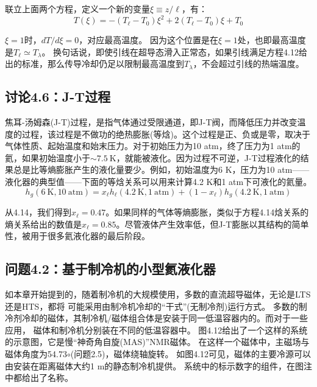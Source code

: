 联立上面两个方程，定义一个新的变量$\xi\equiv z/\ell$，有：
\begin{equation}%
T(\xi)=-(T_\ell-T_0)\xi^2+2(T_\ell-T_0)\xi+T_0
\end{equation}

$\xi=1$时，$dT/d\xi=0$，对应最高温度。
因为这个位置是在$\xi=1$处，也即最高温度是$T_\ell\simeq T_\lambda$。
换句话说，即使引线在超导态滑入正常态，如果引线满足方程4.12给出的标准，那么传导冷却仍足以限制最高温度到$T_\lambda$，不会超过引线的热端温度。


\subsection{讨论4.6：J-T过程}
焦耳-汤姆森(J-T)过程，是指气体通过受限通道，即J-T阀，而降低压力并改变温度的过程，该过程是不做功的绝热膨胀(等焓)。这个过程是正、负或是零，取决于气体性质、起始温度和始末压力。对于初始压力为10 atm，终了压力为1 atm的氦，如果初始温度小于$\sim 7.5\ \mathrm{K}$，就能被液化。因为过程不可逆，J-T过程液化的结果总是比等熵膨胀产生的液化量要少。例如，初始温度为6 K，压力为10 atm——液化器的典型值——下面的等焓关系可以用来计算4.2 K和1 atm下可液化的氦量。
\begin{equation}%
h_g(6\ \mathrm{K},10\ \mathrm{atm})=x_\ell h_\ell(4.2\ \mathrm{K},1\ \mathrm{atm})+(1-x_\ell)h_g(4.2\ \mathrm{K},1\ \mathrm{atm})
\end{equation}

从4.14，我们得到$x_\ell=0.47$。如果同样的气体等熵膨胀，类似于方程4.14焓关系的熵关系给出的数值是$x_\ell=0.85$。尽管液体产生效率低，但J-T膨胀以其结构的简单性，被用于很多氦液化器的最后阶段。


\subsection{问题4.2：基于制冷机的小型氦液化器}
如本章开始提到的，随着制冷机的大规模使用，多数的直流超导磁体，无论是LTS还是HTS，都将
可能采用由制冷机冷却的“干式”(无制冷剂)运行方式。
多数的制冷剂冷却的磁体，其制冷机/磁体组合体是安装于同一低温容器内的。而对于一些应用，
磁体和制冷机分别装在不同的低温容器中。
图4.12给出了一个这样的系统的示意图，它是慢“神奇角自旋(MAS)”NMR磁体。
在这样一个磁体中，主磁场与磁体角度为54.73$\circ$(问题2.5)，磁体绕轴旋转。
如图4.12可见，磁体的主要冷源可以由安装在距离磁体大约1 m的静态制冷机提供。 
系统中的标示数字的组件，在图注中都给出了名称。

